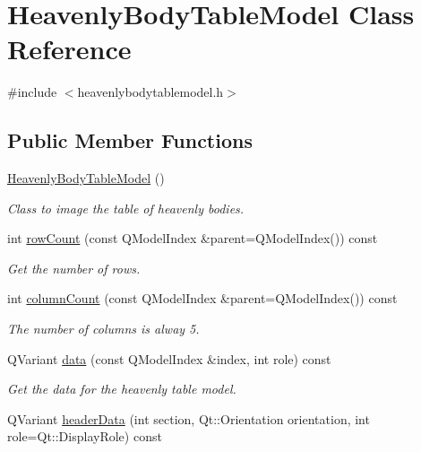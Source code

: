 \hypertarget{classHeavenlyBodyTableModel}{
\section{\-Heavenly\-Body\-Table\-Model \-Class \-Reference}
\label{da/dd6/classHeavenlyBodyTableModel}
}


{\ttfamily \#include $<$heavenlybodytablemodel.\-h$>$}

\subsection*{\-Public \-Member \-Functions}
\begin{DoxyCompactItemize}
\item 
\hyperlink{classHeavenlyBodyTableModel_afc3e59982a7332e66a4db704f71d36c7}{\-Heavenly\-Body\-Table\-Model} ()
\begin{DoxyCompactList}\small\item\em \-Class to image the table of heavenly bodies. \end{DoxyCompactList}\item 
int \hyperlink{classHeavenlyBodyTableModel_aba97512e0a8a43331dd6feeaa27fb66a}{row\-Count} (const \-Q\-Model\-Index \&parent=\-Q\-Model\-Index()) const 
\begin{DoxyCompactList}\small\item\em \-Get the number of rows. \end{DoxyCompactList}\item 
int \hyperlink{classHeavenlyBodyTableModel_aeee6cd311fa44f8f276d473e874608c4}{column\-Count} (const \-Q\-Model\-Index \&parent=\-Q\-Model\-Index()) const 
\begin{DoxyCompactList}\small\item\em \-The number of columns is alway 5. \end{DoxyCompactList}\item 
\-Q\-Variant \hyperlink{classHeavenlyBodyTableModel_ab450e3826f355205a1336681a7e006cd}{data} (const \-Q\-Model\-Index \&index, int role) const 
\begin{DoxyCompactList}\small\item\em \-Get the data for the heavenly table model. \end{DoxyCompactList}\item 
\-Q\-Variant \hyperlink{classHeavenlyBodyTableModel_a0709ed21d963741035372724d0170cd6}{header\-Data} (int section, \-Qt\-::\-Orientation orientation, int role=\-Qt\-::\-Display\-Role) const 

\end{DoxyCompactItemize}
